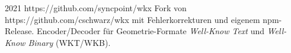 \cventry
{2021}
{https://github.com/syncpoint/wkx}
{}
{}
{}
{
  Fork von https://github.com/cschwarz/wkx mit Fehlerkorrekturen und eigenem npm-Release.
  Encoder/Decoder für Geometrie-Formate \emph{Well-Know Text} und \emph{Well-Know Binary} (WKT/WKB).
}
